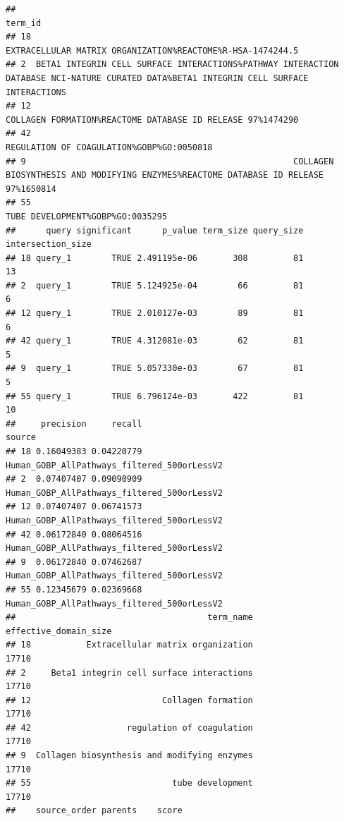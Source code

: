 \documentclass[
]{book}
\begin{document}
\begin{verbatim}
##                                                                                                                                   term_id
## 18                                                                             EXTRACELLULAR MATRIX ORGANIZATION%REACTOME%R-HSA-1474244.5
## 2  BETA1 INTEGRIN CELL SURFACE INTERACTIONS%PATHWAY INTERACTION DATABASE NCI-NATURE CURATED DATA%BETA1 INTEGRIN CELL SURFACE INTERACTIONS
## 12                                                                             COLLAGEN FORMATION%REACTOME DATABASE ID RELEASE 97%1474290
## 42                                                                                              REGULATION OF COAGULATION%GOBP%GO:0050818
## 9                                                     COLLAGEN BIOSYNTHESIS AND MODIFYING ENZYMES%REACTOME DATABASE ID RELEASE 97%1650814
## 55                                                                                                       TUBE DEVELOPMENT%GOBP%GO:0035295
##      query significant      p_value term_size query_size intersection_size
## 18 query_1        TRUE 2.491195e-06       308         81                13
## 2  query_1        TRUE 5.124925e-04        66         81                 6
## 12 query_1        TRUE 2.010127e-03        89         81                 6
## 42 query_1        TRUE 4.312081e-03        62         81                 5
## 9  query_1        TRUE 5.057330e-03        67         81                 5
## 55 query_1        TRUE 6.796124e-03       422         81                10
##     precision     recall                                      source
## 18 0.16049383 0.04220779 Human_GOBP_AllPathways_filtered_500orLessV2
## 2  0.07407407 0.09090909 Human_GOBP_AllPathways_filtered_500orLessV2
## 12 0.07407407 0.06741573 Human_GOBP_AllPathways_filtered_500orLessV2
## 42 0.06172840 0.08064516 Human_GOBP_AllPathways_filtered_500orLessV2
## 9  0.06172840 0.07462687 Human_GOBP_AllPathways_filtered_500orLessV2
## 55 0.12345679 0.02369668 Human_GOBP_AllPathways_filtered_500orLessV2
##                                      term_name effective_domain_size
## 18           Extracellular matrix organization                 17710
## 2     Beta1 integrin cell surface interactions                 17710
## 12                          Collagen formation                 17710
## 42                   regulation of coagulation                 17710
## 9  Collagen biosynthesis and modifying enzymes                 17710
## 55                            tube development                 17710
##    source_order parents    score

\end{verbatim}
\end{document}

